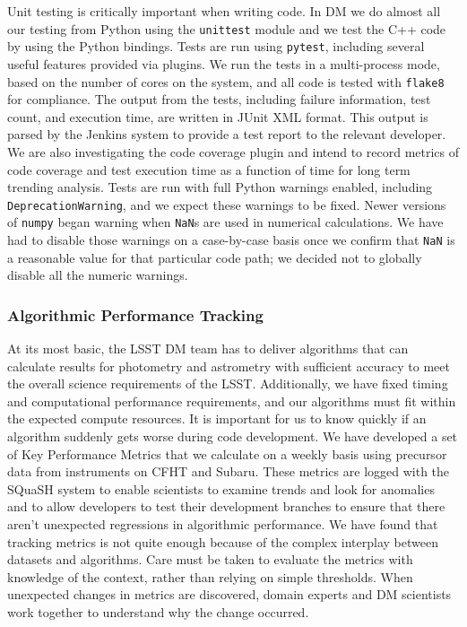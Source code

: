Unit testing is critically important when writing code.
In DM we do almost all our testing from Python using the \texttt{unittest} module and we test the C++ code by using the Python bindings.
Tests are run using \texttt{pytest}\cite{pytest}, including several useful features provided via plugins.
We run the tests in a multi-process mode, based on the number of cores on the system, and all code is tested with \texttt{flake8} for compliance.
The output from the tests, including failure information, test count, and execution time, are written in JUnit XML format.  This output is parsed by the Jenkins system to provide a test report to the relevant developer.
We are also investigating the code coverage plugin and intend to record metrics of code coverage and test execution time as a function of time for long term trending analysis.
Tests are run with full Python warnings enabled, including \texttt{DeprecationWarning}, and we expect these warnings to be fixed.
Newer versions of \texttt{numpy} began warning when \texttt{NaN}s are used in numerical calculations. We have had to disable those warnings on a case-by-case basis once we confirm that \texttt{NaN} is a reasonable value for that particular code path; we decided not to globally disable all the numeric warnings.

\subsubsection{Algorithmic Performance Tracking}

At its most basic, the LSST DM team has to deliver algorithms that can calculate results for photometry and astrometry with sufficient accuracy to meet the overall science requirements of the LSST\cite{LPM-17}.
Additionally, we have fixed timing and computational performance requirements, and our algorithms must fit within the expected compute resources.
It is important for us to know quickly if an algorithm suddenly gets worse during code development.
We have developed a set of Key Performance Metrics that we calculate on a weekly basis using precursor data from instruments on CFHT and Subaru.
These metrics are logged with the SQuaSH system\cite{SQR-009} to enable scientists to examine trends and look for anomalies and to allow developers to test their development branches to ensure that there aren't unexpected regressions in algorithmic performance.
We have found that tracking metrics is not quite enough because of the complex interplay between datasets and algorithms.
Care must be taken to evaluate the metrics with knowledge of the context, rather than relying on simple thresholds.
When unexpected changes in metrics are discovered, domain experts and DM scientists work together to understand why the change occurred.
